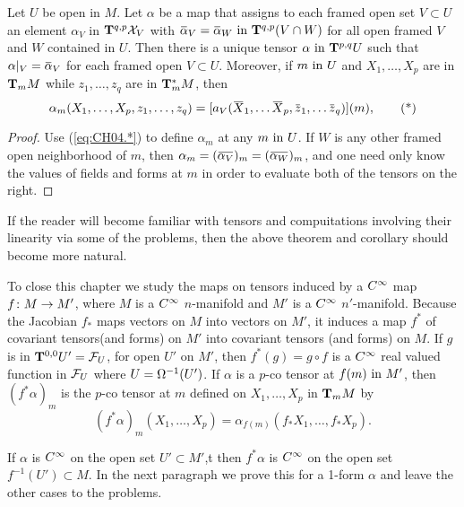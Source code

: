 \documentclass[../main]{subfiles}
\begin{document}
\begin{corollary} \label{cor:ch4.2}
Let $U$ be open in $M$. Let $\alpha$ be a map that assigns to each framed open set $V\subset U$ an element $\alpha_V$ in $\tensorbundle{\vectorFields_V}{q}{p}$ with $\xoverline\alpha_V = \xoverline\alpha_W \InText \tensorbundle{(V\cap W)}{q}{p}$ for all open framed $V$ and $W$ contained in $U$. Then there is a unique tensor $\alpha \InText \tensorbundle{U}{p}{q}$ such that $\alpha|_V = \xoverline\alpha_V$ for each framed open $V\subset U$. Moreover, if $m\InText U$ and $X_1,\dots,X_p$ are in $\tangentspace{M}{m}$ while $z_1,\dots,z_q$ are in $\cotangentspace{M}{m}$, then
\[
\alpha_m(X_1,\dots,X_p, z_1,\dots,z_q) = [a_V(\xoverline X_1,\dots\xoverline X_p, \xoverline z_1,\dots\xoverline z_q)](m), \tag{*} \label{eq:CH04.*}
\]
\end{corollary}

\begin{proof}
Use (\ref{eq:CH04.*}) to define $\alpha_m$ at any $m\InText U$. If $W$ is any other framed open neighborhood of $m$, then $\alpha_m = (\xoverline{\alpha_V})_m = (\xoverline{\alpha_W})_m$, and one need only know the values of fields and forms at $m$ in order to evaluate both of the tensors on the right.
\end{proof}



If the reader will become familiar with tensors and compuitations involving their linearity via some of the problems, then the above theorem and corollary should become more natural.

To close this chapter we study the maps on tensors induced by a $\CInfty$ map $f \colon M \functionMaps M'$, where $M$ is a $\CInfty$ $n$-manifold and $M'$ is a $\CInfty$ $n'$-manifold. Because the Jacobian $f_*$ maps vectors on $M$ into vectors on $M'$, it induces a map $f^\ast$ of covariant tensors(and forms) on $M'$ into covariant tensors (and forms) on $M$. If $g$ is in $\tensorbundle{U'}{0}{ 0} = \realFunctions_U$, for open $U'$ on $M'$, then $f^\ast (g) = g\circ f$ is a $\CInfty$ real valued function in $\realFunctions_U$ where $U = \formbundle{U'}{{-1}}$. If $\alpha$ is a $p$-co tensor at $f(m) \InText M'$, then $(f^*\alpha)_m$ is the $p$-co tensor at $m$ defined on $X_1,\dots,X_p$ in $\tangentspace{M}{m}$ by
\[ (f^\ast\alpha)_m(X_1,\dots,X_p)  = \alpha_{f(m)}(f_*X_1,\dots,f_*X_p). \]

If $\alpha$ is $\CInfty$ on the open set $U' \subset M'$,t then $f^\ast \alpha$ is $\CInfty$ on the open set $f^{-1}(U')\subset M$. In the next paragraph we prove this for a 1-form $\alpha$ and leave the other cases to the problems.
\end{document}

